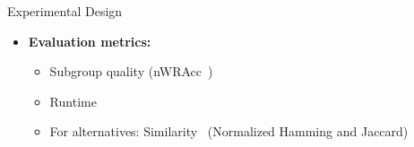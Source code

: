 \documentclass[en, navbaroff, handout]{sdqbeamer}
\begin{document}
\begin{frame}[t]{Experimental Design}
\begin{itemize}
\begin{itemize}
		\end{itemize}
		\pause
		\vspace{\baselineskip}
		\item \textbf{Evaluation metrics:}
		\begin{itemize}
			\item Subgroup quality (nWRAcc~\cite{lavravc1999rule, mathonat2021anytime})
			\item Runtime
			\item For alternatives: Similarity~\cite{choi2010survey} (Normalized Hamming and Jaccard)
		\end{itemize}
	\end{itemize}
\end{frame}
\end{document}
